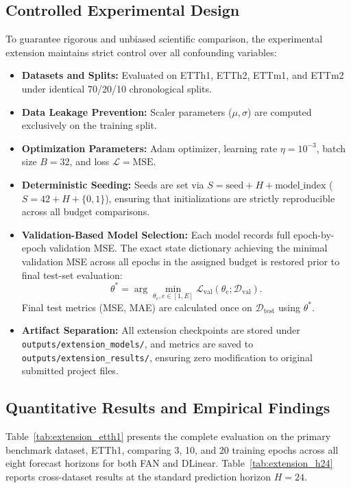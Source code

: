 \documentclass[conference,10pt]{IEEEtran}
\begin{document}
\subsection{Controlled Experimental Design}
To guarantee rigorous and unbiased scientific comparison, the experimental extension maintains strict control over all confounding variables:
\begin{itemize}
    \item \textbf{Datasets and Splits:} Evaluated on ETTh1, ETTh2, ETTm1, and ETTm2 under identical 70/20/10 chronological splits.
    \item \textbf{Data Leakage Prevention:} Scaler parameters ($\mu, \sigma$) are computed exclusively on the training split.
    \item \textbf{Optimization Parameters:} Adam optimizer, learning rate $\eta = 10^{-3}$, batch size $B=32$, and loss $\mathcal{L}=\mathrm{MSE}$.
    \item \textbf{Deterministic Seeding:} Seeds are set via $S = \text{seed} + H + \text{model\_index}$ ($S=42 + H + \{0, 1\}$), ensuring that initializations are strictly reproducible across all budget comparisons.
    \item \textbf{Validation-Based Model Selection:} Each model records full epoch-by-epoch validation MSE. The exact state dictionary achieving the minimal validation MSE across all epochs in the assigned budget is restored prior to final test-set evaluation:
    \begin{equation}
    \theta^* = \arg\min_{\theta_e, e \in [1, E]} \mathcal{L}_{\mathrm{val}}(\theta_e; \mathcal{D}_{\mathrm{val}}).
    \end{equation}
    Final test metrics (MSE, MAE) are calculated once on $\mathcal{D}_{\mathrm{test}}$ using $\theta^*$.
    \item \textbf{Artifact Separation:} All extension checkpoints are stored under \texttt{outputs/extension\_models/}, and metrics are saved to \texttt{outputs/extension\_results/}, ensuring zero modification to original submitted project files.
\end{itemize}

\subsection{Quantitative Results and Empirical Findings}

Table~\ref{tab:extension_etth1} presents the complete evaluation on the primary benchmark dataset, ETTh1, comparing 3, 10, and 20 training epochs across all eight forecast horizons for both FAN and DLinear. Table~\ref{tab:extension_h24} reports cross-dataset results at the standard prediction horizon $H=24$.
\end{document}
